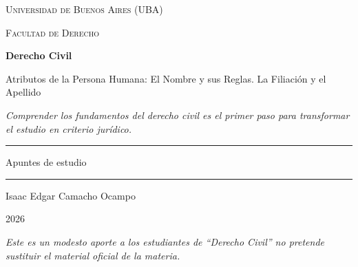 \documentclass[12pt,oneside]{book}
\newcommand{\universidad}{Universidad de Buenos Aires (UBA)}
\newcommand{\facultad}{Facultad de Derecho}
\newcommand{\materia}{Derecho Civil}
\newcommand{\titulo}{Atributos de la Persona Humana: El Nombre y sus Reglas. La Filiación y el Apellido}
\newcommand{\autor}{Isaac Edgar Camacho Ocampo}
\newcommand{\anio}{2026}
\newcommand{\reflexionmotivacional}{Comprender los fundamentos del derecho civil es el primer paso para transformar el estudio en criterio jurídico.}
\begin{document}
\begin{titlepage}
\thispagestyle{empty}

\begin{center}

\vspace*{1cm}

{\large \textsc{\universidad}}

\vspace{0.2cm}

{\large \textsc{\facultad}}

\vspace{3cm}

{\Huge \textbf{\materia}}

\vspace{1cm}

{\LARGE \titulo}

\vspace{0.8cm}

\textit{\reflexionmotivacional}

\vspace{1.2cm}

\rule{0.70\textwidth}{0.5pt}

\vspace{0.5cm}

{\large Apuntes de estudio}

\vspace{0.5cm}

\rule{0.70\textwidth}{0.5pt}

\vfill

{\large \autor}

\vspace{0.3cm}

{\large \anio}

\end{center}

\vfill

\begin{flushleft}
\textit{Este es un modesto aporte a los estudiantes de ``Derecho Civil'' no pretende sustituir el material oficial de la materia.}
\end{flushleft}

\end{titlepage}

\tableofcontents

\end{document}
